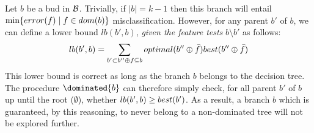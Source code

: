 \documentclass{llncs}
\newcommand{\lb}[1]{\ensuremath{lb({#1})}}
\newcommand{\bud}[0]{\ensuremath{{\cal B}}}
\newcommand{\afeat}[0]{\ensuremath{f}}
\newcommand{\dom}[1][]{\ensuremath{\ifthenelse{\equal{#1}{}}{dom}{dom({#1})}}}
\newcommand{\best}[1][]{\ensuremath{\ifthenelse{\equal{#1}{}}{{best}}{{best({#1})}}}}
\newcommand{\opt}[1][]{\ensuremath{\ifthenelse{\equal{#1}{}}{optimal}{optimal({#1})}}}
\newcommand{\error}[1][]{\ensuremath{\ifthenelse{\equal{#1}{}}{{error}}{{error({{#1}})}}}}
\newcommand{\abranch}[0]{\ensuremath{b}}
\newcommand{\mdepth}[0]{\ensuremath{k}}
\newcommand{\grow}[2]{\ensuremath{{#1}\oplus{#2}}}
\begin{document}
Let $\abranch$ be a bud in $\bud$. Trivially, if $|\abranch|=\mdepth-1$ then this branch will entail $\min\{\error[\afeat] \mid \afeat \in \dom[\abranch]\}$ misclassification.
However, for any parent $\abranch'$ of $\abranch$, we can define a lower bound $\lb{\abranch',\abranch}$, \emph{given the feature tests} $\abranch \setminus \abranch'$ as follows:
$$
\lb{\abranch',\abranch} = \sum\limits_{\abranch' \subset \grow{\abranch''}{\afeat} \subseteq \abranch}\opt[\grow{\abranch''}{\bar{\afeat}}]\best[\grow{\abranch''}{\bar{\afeat}}]
$$
This lower bound is correct as long as the branch $\abranch$ belongs to the decision tree.
The procedure $\dominated{\abranch}$ can therefore simply check, for all parent $\abranch'$ of $\abranch$ up until the root ($\emptyset$), whether $\lb{\abranch',\abranch} \geq \best[\abranch']$. As a result, a branch $\abranch$ which is guaranteed, by this reasoning, to never belong to a non-dominated tree will not be explored further.
\end{document}
